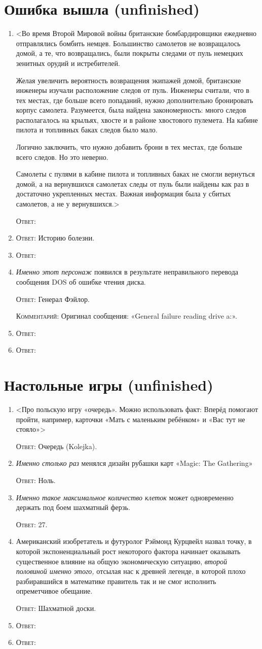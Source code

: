 \documentclass[a4paper,10pt]{article}
\let\keyword\textsc
\newenvironment{topic}{\begin{enumerate}}{\end{enumerate}}
\newcommand{\question}[3]{\item[#1.] #2 \par \keyword{Ответ:} #3}
\newcommand{\commentary}[1]{\par \keyword{Комментарий:} #1}
\begin{document}
\section{Ошибка вышла (unfinished)}

\begin{topic}
 \question{??}{<Во время Второй Мировой войны британские бомбардировщики ежедневно отправлялись бомбить немцев. Большинство самолетов не возвращалось домой, а те, что возвращались, были покрыты следами от пуль немецких зенитных орудий и истребителей.

 Желая увеличить вероятность возвращения экипажей домой, британские инженеры изучали расположение следов от пуль. Инженеры считали, что в тех местах, где больше всего попаданий, нужно дополнительно бронировать корпус самолета. Разумеется, была найдена закономерность: много следов располагалось на крыльях, хвосте и в районе хвостового пулемета. На кабине пилота и топливных баках следов было мало.

 Логично заключить, что нужно добавить брони в тех местах, где больше всего следов. Но это неверно.

 Самолеты с пулями в кабине пилота и топливных баках не смогли вернуться домой, а на вернувшихся самолетах следы от пуль были найдены как раз в достаточно укрепленных местах. Важная информация была у сбитых самолетов, а не у вернувшихся.>}{}
 \question{10--20}{<вопрос про одноимённую песню Высоцкого: именно это на самом деле>}{Историю болезни.}
 \question{20}{}{}
 \question{30}{\emph{Именно этот персонаж} появился в результате неправильного перевода сообщения DOS об ошибке чтения диска.}{Генерал Фэйлор.}\commentary{Оригинал сообщения: «General failure reading drive a:».}
 \question{40}{}{}
 \question{50}{}{}
\end{topic}


\section{Настольные игры (unfinished)}

\begin{topic}
 \question{??}{<Про польскую игру «очередь». Можно использовать факт: Вперёд помогают пройти, например, карточки «Мать с маленьким ребёнком» и «Вас тут не стояло»>}{Очередь (Kolejka).}
 \question{0--10}{\emph{Именно столько раз} менялся дизайн рубашки карт «Magic: The Gathering»}{Ноль.}
 \question{10--20}{\emph{Именно такое максимальное количество клеток} может одновременно держать под боем шахматный ферзь.}{27.}
 \question{20--30}{Американский изобретатель и футуролог Рэймонд Курцвейл назвал точку, в которой экспоненциальный рост некоторого фактора начинает оказывать существенное влияние на общую экономическую ситуацию, \emph{второй половиной именно этого,} отсылая нас к древней легенде, в которой плохо разбиравшийся в математике правитель так и не смог исполнить опреметчивое обещание.}{Шахматной доски.}
 \question{40}{}{}
 \question{50}{}{}
\end{topic}
\end{document}
